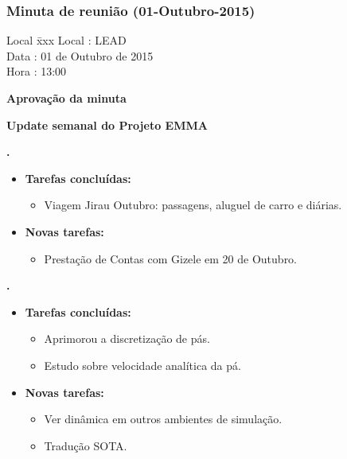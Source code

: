 \subsubsection{Minuta de reunião (01-Outubro-2015)}

\begin{tabbing}
  Local \= xxx \kill
  Local \> : LEAD \\
  Data  \> : 01 de Outubro de 2015 \\
  Hora  \> : 13:00
\end{tabbing}


\textbf{Aprovação da minuta}

\textbf{Update semanal do Projeto EMMA}
   							
\textbf{\alana.} 
	\begin{itemize}
		\item \textbf{Tarefas concluídas:}
			\begin{itemize}    
				\item Viagem Jirau Outubro: passagens, aluguel de carro e diárias.

			 
			\end{itemize}
		
		\item \textbf{Novas tarefas:}
			\begin{itemize} 
				\item Prestação de Contas com Gizele em 20 de Outubro.
			\end{itemize}
	\end{itemize}   		

	  \textbf{\renan.} 
	\begin{itemize}
		\item \textbf{Tarefas concluídas:}
			\begin{itemize}    
				\item Aprimorou a discretização de pás.
				\item Estudo sobre velocidade analítica da pá.
			\end{itemize}
		
		\item \textbf{Novas tarefas:}
			\begin{itemize} 
			    \item Ver dinâmica em outros ambientes de simulação.
			    \item Tradução SOTA.
			\end{itemize}
	\end{itemize}	
	
